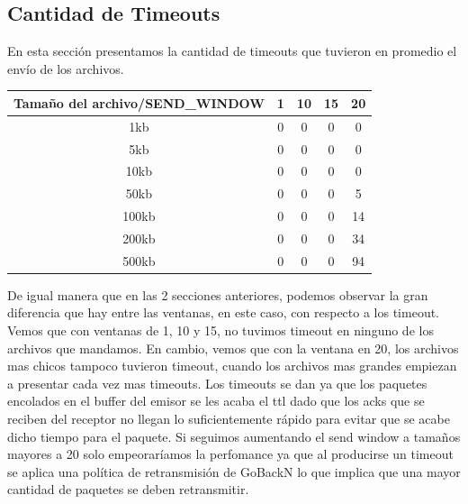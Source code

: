 \subsection{Cantidad de Timeouts}
\indent En esta sección presentamos la cantidad de timeouts que tuvieron en promedio el envío de los archivos.\\
\begin{center}
   \begin{tabular}{| c | c | c | c | c |}
    \hline
    Tamaño del archivo/SEND\_WINDOW & 1 & 10 & 15 & 20\\
    \hline
    1kb & 0 & 0 & 0 & 0 \\
    \hline
    5kb & 0 & 0 & 0 & 0 \\
    \hline
    10kb & 0 & 0 & 0 & 0\\
    \hline
    50kb & 0 & 0 & 0 & 5\\
    \hline
    100kb & 0 & 0 & 0 & 14\\
    \hline
    200kb & 0 & 0 & 0 & 34\\
    \hline
    500kb & 0 & 0 & 0 & 94\\
    \hline
  \end{tabular}
\end{center}

\indent De igual manera que en las 2 secciones anteriores, podemos observar la gran
diferencia que hay entre las ventanas, en este caso, con respecto a los
timeout.\\
\indent Vemos que con ventanas de 1, 10 y 15, no tuvimos timeout en ninguno de
los archivos que mandamos. En cambio, vemos que con la ventana en 20, los
archivos mas chicos tampoco tuvieron timeout, cuando los archivos mas grandes
empiezan a presentar cada vez mas timeouts. Los timeouts se dan ya que los paquetes encolados en el buffer del emisor se les acaba el ttl dado que los acks que se reciben del receptor no llegan lo suficientemente rápido para evitar que se acabe dicho tiempo para el paquete. Si seguimos aumentando el send window a tamaños mayores a 20 solo empeoraríamos la perfomance ya que al producirse un timeout se aplica una política de retransmisión de GoBackN lo que implica que una mayor cantidad de paquetes se deben retransmitir.\\

